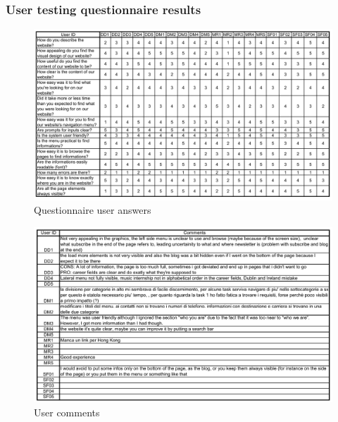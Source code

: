 \documentclass[11pt, letterpaper]{article}
\begin{document}
\subsubsection{User testing questionnaire results}
    \begin{figure}[H]
        \centering
        \includegraphics[width=18cm]{images/annex/Questionnaire_answers.png}
        \caption{Questionnaire user answers}
        \label{fig:my_label}
    \end{figure}
    \begin{figure}[H]
        \centering
        \includegraphics[width=18cm]{images/annex/Questionnaire_comments.png}
        \caption{User comments}
        \label{fig:my_label}
    \end{figure}


\end{document}
